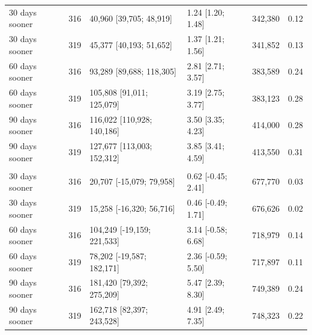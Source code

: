 \documentclass{article}
\begin{document}
\begin{table}
\begin{tabular}[t]{lrlllr}
\hspace{1em}30 days sooner & 316 & 40,960 [39,705; 48,919] & 1.24 [1.20; 1.48] & 342,380 & 0.12\\
\hspace{1em}30 days sooner & 319 & 45,377 [40,193; 51,652] & 1.37 [1.21; 1.56] & 341,852 & 0.13\\
\hspace{1em}60 days sooner & 316 & 93,289 [89,688; 118,305] & 2.81 [2.71; 3.57] & 383,589 & 0.24\\
\hspace{1em}60 days sooner & 319 & 105,808 [91,011; 125,079] & 3.19 [2.75; 3.77] & 383,123 & 0.28\\
\hspace{1em}90 days sooner & 316 & 116,022 [110,928; 140,186] & 3.50 [3.35; 4.23] & 414,000 & 0.28\\
\hspace{1em}90 days sooner & 319 & 127,677 [113,003; 152,312] & 3.85 [3.41; 4.59] & 413,550 & 0.31\\
\addlinespace[0.3em]
\multicolumn{6}{l}{\textbf{US to Jan 2022}}\\
\hspace{1em}30 days sooner & 316 & 20,707 [-15,079; 79,958] & 0.62 [-0.45; 2.41] & 677,770 & 0.03\\
\hspace{1em}30 days sooner & 319 & 15,258 [-16,320; 56,716] & 0.46 [-0.49; 1.71] & 676,626 & 0.02\\
\hspace{1em}60 days sooner & 316 & 104,249 [-19,159; 221,533] & 3.14 [-0.58; 6.68] & 718,979 & 0.14\\
\hspace{1em}60 days sooner & 319 & 78,202 [-19,587; 182,171] & 2.36 [-0.59; 5.50] & 717,897 & 0.11\\
\hspace{1em}90 days sooner & 316 & 181,420 [79,392; 275,209] & 5.47 [2.39; 8.30] & 749,389 & 0.24\\
\hspace{1em}90 days sooner & 319 & 162,718 [82,397; 243,528] & 4.91 [2.49; 7.35] & 748,323 & 0.22\\
\bottomrule
\end{tabular}
\end{table}
\end{document}

